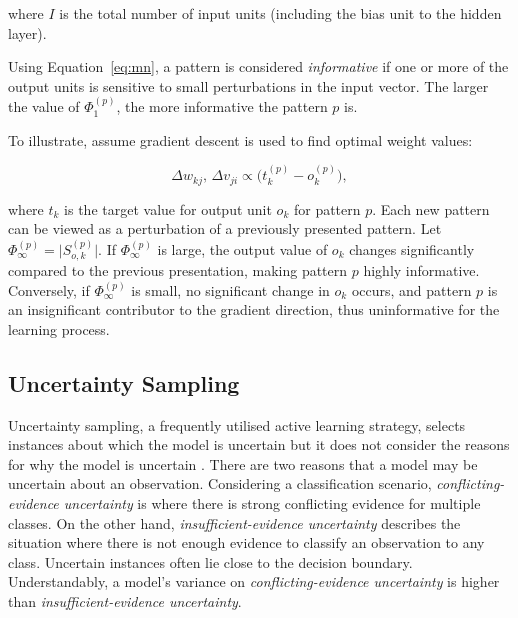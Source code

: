 \documentclass[10pt, conference]{IEEEtran}
\begin{document}
where $I$ is the total number of input units (including the bias unit to the hidden layer).  

Using Equation~\ref{eq:mn}, a pattern is considered \textit{informative} if one or more of the output units is sensitive to small perturbations in the input vector. The larger the value of $\Phi_1^{(p)}$, the more informative the pattern $p$ is.  

To illustrate, assume gradient descent is used to find optimal weight values:

\begin{equation}
	\Delta w_{kj}, \, \Delta v_{ji} \propto \big(t_k^{(p)} - o_k^{(p)}\big),
\end{equation}

where $t_k$ is the target value for output unit $o_k$ for pattern $p$.  
Each new pattern can be viewed as a perturbation of a previously presented pattern. Let $\Phi_\infty^{(p)} = \big| S_{o,k}^{(p)}\big|$. If $\Phi_\infty^{(p)}$ is large, the output value of $o_k$ changes significantly compared to the previous presentation, making pattern $p$ highly informative. Conversely, if $\Phi_\infty^{(p)}$ is small, no significant change in $o_k$ occurs, and pattern $p$ is an insignificant contributor to the gradient direction, thus uninformative for the learning process.


\subsection{Uncertainty Sampling}
Uncertainty sampling, a frequently utilised active learning strategy, selects instances about which the model is uncertain but it does not consider the reasons for why the model is uncertain \cite{alus}. There are two reasons that a model may be uncertain about an observation. Considering a classification scenario, \textit{conflicting-evidence uncertainty} is where there is strong conflicting evidence for multiple classes. On the other hand, \textit{insufficient-evidence uncertainty} describes the situation where there is not enough evidence to classify an observation to any class. Uncertain instances often lie close to the decision boundary. Understandably, a model's variance on \textit{conflicting-evidence uncertainty} is higher than \textit{insufficient-evidence uncertainty}. 
\end{document}
